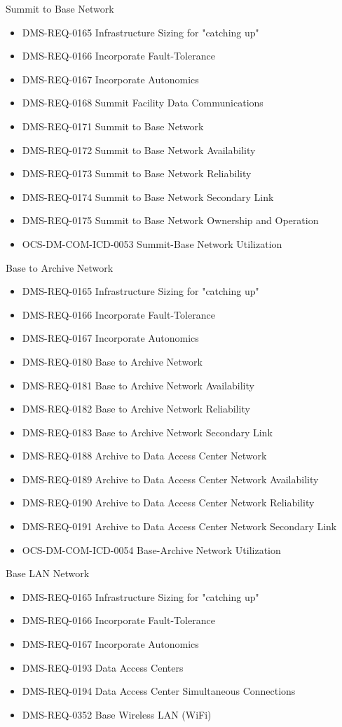 Summit to Base Network \begin{itemize}
\item DMS-REQ-0165 Infrastructure Sizing for "catching up"
\item DMS-REQ-0166 Incorporate Fault-Tolerance
\item DMS-REQ-0167 Incorporate Autonomics
\item DMS-REQ-0168 Summit Facility Data Communications
\item DMS-REQ-0171 Summit to Base Network
\item DMS-REQ-0172 Summit to Base Network Availability
\item DMS-REQ-0173 Summit to Base Network Reliability
\item DMS-REQ-0174 Summit to Base Network Secondary Link
\item DMS-REQ-0175 Summit to Base Network Ownership and Operation
\item OCS-DM-COM-ICD-0053 Summit-Base Network Utilization
\end{itemize}
Base to Archive Network \begin{itemize}
\item DMS-REQ-0165 Infrastructure Sizing for "catching up"
\item DMS-REQ-0166 Incorporate Fault-Tolerance
\item DMS-REQ-0167 Incorporate Autonomics
\item DMS-REQ-0180 Base to Archive Network
\item DMS-REQ-0181 Base to Archive Network Availability
\item DMS-REQ-0182 Base to Archive Network Reliability
\item DMS-REQ-0183 Base to Archive Network Secondary Link
\item DMS-REQ-0188 Archive to Data Access Center Network
\item DMS-REQ-0189 Archive to Data Access Center Network Availability
\item DMS-REQ-0190 Archive to Data Access Center Network Reliability
\item DMS-REQ-0191 Archive to Data Access Center Network Secondary Link
\item OCS-DM-COM-ICD-0054 Base-Archive Network Utilization
\end{itemize}
Base LAN Network \begin{itemize}
\item DMS-REQ-0165 Infrastructure Sizing for "catching up"
\item DMS-REQ-0166 Incorporate Fault-Tolerance
\item DMS-REQ-0167 Incorporate Autonomics
\item DMS-REQ-0193 Data Access Centers
\item DMS-REQ-0194 Data Access Center Simultaneous Connections
\item DMS-REQ-0352 Base Wireless LAN (WiFi)
\end{itemize}
